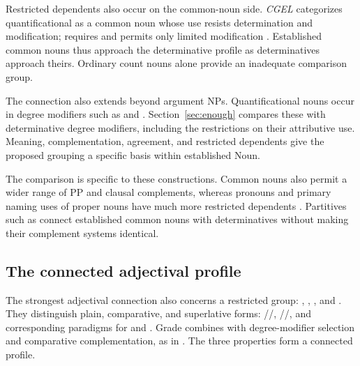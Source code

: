 \documentclass[12pt]{article}
\begin{document}
Restricted dependents also occur on the common-noun side. \textit{CGEL} categorizes quantificational  as a common noun whose use resists determination and modification;  requires  and permits only limited modification \citep[349--350]{huddleston2002}. Established common nouns thus approach the determinative profile as determinatives approach theirs. Ordinary count nouns alone provide an inadequate comparison group.

The connection also extends beyond argument NPs. Quantificational nouns occur in degree modifiers such as  and  \citep[549--550]{huddleston2002}. Section~\ref{sec:enough} compares these with determinative degree modifiers, including the restrictions on their attributive use. Meaning, complementation, agreement, and restricted dependents give the proposed grouping a specific basis within established Noun.

The comparison is specific to these constructions. Common nouns also permit a wider range of PP and clausal complements, whereas pronouns and primary naming uses of proper nouns have much more restricted dependents \citep[429--430, 439--443, 517--521]{huddleston2002}. Partitives such as  connect established common nouns with determinatives without making their complement systems identical.

\subsection{The connected adjectival profile}\label{sec:adjectival-profile}

The strongest adjectival connection also concerns a restricted group: , , , and . They distinguish plain, comparative, and superlative forms: /\allowbreak{}/\allowbreak{}, /\allowbreak{}/\allowbreak{}, and corresponding paradigms for  and  \citep[391--395]{huddleston2002}. Grade combines with degree-modifier selection and comparative complementation, as in . The three properties form a connected profile.
\end{document}
